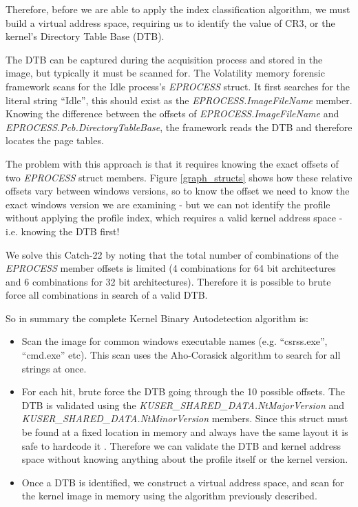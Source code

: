 Therefore, before we are able to apply the index classification algorithm, we
must build a virtual address space, requiring us to identify the value of CR3,
or the kernel's Directory Table Base (DTB).

The DTB can be captured during the acquisition process and stored in the image,
but typically it must be scanned for. The Volatility memory forensic framework
scans for the Idle process's {\em EPROCESS} struct. It first searches for the
literal string ``Idle'', this should exist as the {\em EPROCESS.ImageFileName}
member. Knowing the difference between the offsets of {\em
  EPROCESS.ImageFileName} and {\em EPROCESS.Pcb.DirectoryTableBase}, the
framework reads the DTB and therefore locates the page tables.

The problem with this approach is that it requires knowing the exact offsets of
two {\em EPROCESS} struct members. Figure \ref{graph_structs} shows how these
relative offsets vary between windows versions, so to know the offset we need to
know the exact windows version we are examining - but we can not identify the
profile without applying the profile index, which requires a valid kernel
address space - i.e. knowing the DTB first!

We solve this Catch-22 by noting that the total number of combinations of the
{\em EPROCESS} member offsets is limited (4 combinations for 64 bit
architectures and 6 combinations for 32 bit architectures). Therefore it is
possible to brute force all combinations in search of a valid DTB.

So in summary the complete Kernel Binary Autodetection algorithm is:

\begin{itemize}
\item Scan the image for common windows executable names (e.g. ``csrss.exe'',
  ``cmd.exe'' etc). This scan uses the Aho-Corasick algorithm to search for all
  strings at once.

\item For each hit, brute force the DTB going through the 10 possible
  offsets. The DTB is validated using the {\em
    KUSER\_SHARED\_DATA.NtMajorVersion} and {\em
    KUSER\_SHARED\_DATA.NtMinorVersion} members. Since this struct must be found
  at a fixed location in memory and always have the same layout it is safe to
  hardcode it \citep{temporal}. Therefore we can validate the DTB and kernel
  address space without knowing anything about the profile itself or the kernel
  version.

\item Once a DTB is identified, we construct a virtual address space, and scan
  for the kernel image in memory using the algorithm previously described.

\end{itemize}

